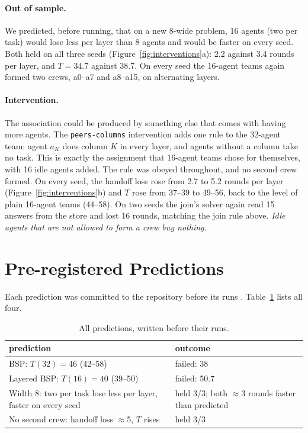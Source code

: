 \documentclass[10pt,twocolumn]{article}
\begin{document}
\paragraph{Out of sample.}
We predicted, before running, that on a new 8-wide problem, 16 agents (two per task) would lose less per layer than 8 agents and would be faster on every seed.
Both held on all three seeds (Figure~\ref{fig:interventions}a): 2.2 against 3.4 rounds per layer, and $T=34.7$ against 38.7.
On every seed the 16-agent teams again formed two crews, a0--a7 and a8--a15, on alternating layers.

\paragraph{Intervention.}
The association could be produced by something else that comes with having more agents.
The \texttt{peers-columns} intervention adds one rule to the 32-agent team: agent $a_K$ does column $K$ in every layer, and agents without a column take no task.
This is exactly the assignment that 16-agent teams chose for themselves, with 16 idle agents added.
The rule was obeyed throughout, and no second crew formed.
On every seed, the handoff loss rose from 2.7 to 5.2 rounds per layer (Figure~\ref{fig:interventions}b) and $T$ rose from 37--39 to 49--56, back to the level of plain 16-agent teams (44--58).
On two seeds the join's solver again read 15 answers from the store and lost 16 rounds, matching the join rule above.
\emph{Idle agents that are not allowed to form a crew buy nothing.}

\section{Pre-registered Predictions}
\label{sec:prereg}

Each prediction was committed to the repository before its runs \citep{nosek2018prereg}. Table~\ref{tab:prereg} lists all four.

\begin{table}[t]
\centering\small
\caption{All predictions, written before their runs.}
\label{tab:prereg}
\begin{tabular}{@{}p{3.9cm}p{3.3cm}@{}}
\toprule
prediction & outcome \\
\midrule
BSP: $T(32)=46$ (42--58) & failed: 38 \\
Layered BSP: $T(16)=40$ (39--50) & failed: 50.7 \\
Width 8: two per task lose less per layer, faster on every seed & held 3/3; both $\approx$3 rounds faster than predicted \\
No second crew: handoff loss $\approx$5, $T$ rises & held 3/3 \\
\bottomrule
\end{tabular}
\end{table}
\end{document}
